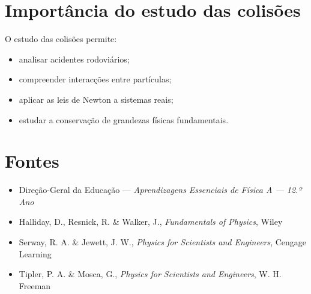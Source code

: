 \documentclass[12pt,a4paper]{article}
\begin{document}
	\section{Importância do estudo das colisões}
	
	O estudo das colisões permite:
	\begin{itemize}
		\item analisar acidentes rodoviários;
		\item compreender interacções entre partículas;
		\item aplicar as leis de Newton a sistemas reais;
		\item estudar a conservação de grandezas físicas fundamentais.
	\end{itemize}
	
	\section{Fontes}
	
	\begin{itemize}
		\item Direção-Geral da Educação — \textit{Aprendizagens Essenciais de Física A — 12.º Ano}
		\item Halliday, D., Resnick, R. \& Walker, J., \textit{Fundamentals of Physics}, Wiley
		\item Serway, R. A. \& Jewett, J. W., \textit{Physics for Scientists and Engineers}, Cengage Learning
		\item Tipler, P. A. \& Mosca, G., \textit{Physics for Scientists and Engineers}, W. H. Freeman
	\end{itemize}
	
\end{document}
